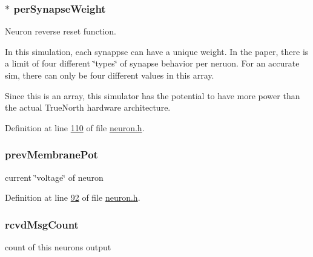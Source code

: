 \subsubsection[{per\+Synapse\+Weight}]{$\ast$ per\+Synapse\+Weight}\label{structneuron_state_ab39656a1580505adcabc4c7a1f4d8100}


Neuron reverse reset function. 

In this simulation, each synappse can have a unique weight. In the paper, there is a limit of four different \char`\"{}types\char`\"{} of synapse behavior per neruon. For an accurate sim, there can only be four different values in this array.

Since this is an array, this simulator has the potential to have more power than the actual True\+North hardware architecture. 

Definition at line \hyperlink{neuron_8h_source_l00110}{110} of file \hyperlink{neuron_8h_source}{neuron.\+h}.

\hypertarget{structneuron_state_ad17e1ac0b4bca75d10da8b0ab56edd6e}{}
\subsubsection[{prev\+Membrane\+Pot}]{ prev\+Membrane\+Pot}\label{structneuron_state_ad17e1ac0b4bca75d10da8b0ab56edd6e}


current \char`\"{}voltage\char`\"{} of neuron 



Definition at line \hyperlink{neuron_8h_source_l00092}{92} of file \hyperlink{neuron_8h_source}{neuron.\+h}.

\hypertarget{structneuron_state_ab8f63a1dfdb2992657530ff8a63fdc01}{}
\subsubsection[{rcvd\+Msg\+Count}]{ rcvd\+Msg\+Count}\label{structneuron_state_ab8f63a1dfdb2992657530ff8a63fdc01}


count of this neuron\textquotesingle{}s output 




